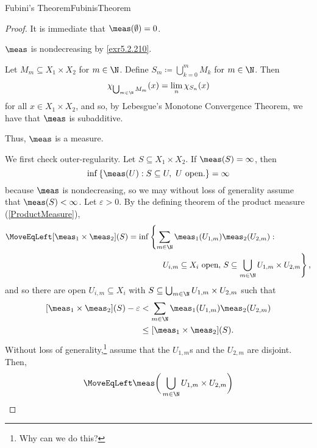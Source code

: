 \begin{thm}{Fubini's Theorem}{FubinisTheorem}
\begin{proof}
It is immediate that $\meas (\emptyset )=0$.

$\meas$ is nondecreasing by \cref{exr5.2.210}.

Let $M_m\subseteq X_1\times X_2$ for $m\in \N$.  Define $S_m\coloneqq \bigcup _{k=0}^mM_k$ for $m\in \N$.  Then
\begin{equation}
\chi _{\bigcup _{m\in \N}M_m}(x)=\lim _n\chi _{S_n}(x)
\end{equation}
for all $x\in X_1\times X_2$, and so, by Lebesgue's Monotone Convergence Theorem, we have that $\meas$ is subadditive.

Thus, $\meas$ is a measure.

We first check outer-regularity.  Let $S\subseteq X_1\times X_2$.  If $\meas (S)=\infty$, then
\begin{equation}
\inf \left\{ \meas (U):S\subseteq U,\ U\text{ open.}\right\} =\infty
\end{equation}
because $\meas$ is nondecreasing, so we may without loss of generality assume that $\meas (S)<\infty$.  Let $\varepsilon >0$.  By the defining theorem of the product measure (\cref{ProductMeasure}),
\begin{equation}
\begin{split}
\MoveEqLeft \relax
[\meas _1\times \meas _2](S) & =\inf \left\{ \sum _{m\in \N}\meas _1(U_{1,m})\meas _2(U_{2,m}):\right. \\ & \qquad \qquad \left. U_{i,m}\subseteq X_i\text{ open, }S\subseteq \bigcup _{m\in \N}U_{1,m}\times U_{2,m}\right\} ,
\end{split}
\end{equation}
and so there are open $U_{i,m}\subseteq X_i$ with $S\subseteq \bigcup _{m\in \N}U_{1,m}\times U_{2,m}$ such that
\begin{equation}\label{eqn5.2.244}
\begin{split}
[\meas _1\times \meas _2](S)-\varepsilon & <\sum _{m\in \N}\meas _1(U_{1,m})\meas _2(U_{2,m}) \\
& \leq [\meas _1\times \meas _2](S).
\end{split}
\end{equation}
Without loss of generality,\footnote{Why can we do this?} assume that the $U_{1,m}$s and the $U_{2,m}$ are disjoint.  Then,
{\footnotesize
\begin{equation}
\begin{split}
\MoveEqLeft
\meas \bigg( \bigcup _{m\in \N}U_{1,m}\times U_{2,m}\bigg) \\

\end{split}
\end{equation}}
\end{proof}
\end{thm}
